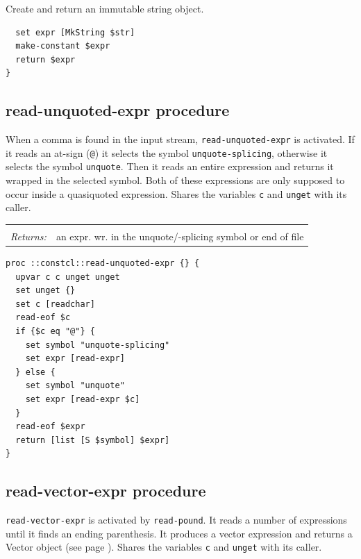 \documentclass[a5paper,draft]{memoir}
\begin{document}
Create and return an immutable string object.

\begin{lstlisting}
  set expr [MkString $str]
  make-constant $expr
  return $expr
}
\end{lstlisting}

\subsection{read-unquoted-expr procedure}
\label{readunquotedexpr-procedure}

When a comma is found in the input stream, \texttt{read-unquoted-expr} is activated. If it reads an at-sign (\texttt{@}) it selects the symbol \texttt{unquote-splicing}, otherwise it selects the symbol \texttt{unquote}. Then it reads an entire expression and returns it wrapped in the selected symbol. Both of these expressions are only supposed to occur inside a quasiquoted expression. Shares the variables \texttt{c} and \texttt{unget} with its caller.

\noindent\begin{tabular}{ |p{1.9cm} p{6.5cm}| }
\hline
\rowcolor[HTML]{CCCCCC} \multicolumn{2}{|l|}{\textbf{read-unquoted-expr (internal)}} \\
\textit{Returns:} & an expr. wr. in the unquote/-splicing symbol or end of file \\
\hline
\end{tabular}

\begin{lstlisting}
proc ::constcl::read-unquoted-expr {} {
  upvar c c unget unget
  set unget {}
  set c [readchar]
  read-eof $c
  if {$c eq "@"} {
    set symbol "unquote-splicing"
    set expr [read-expr]
  } else {
    set symbol "unquote"
    set expr [read-expr $c]
  }
  read-eof $expr
  return [list [S $symbol] $expr]
}
\end{lstlisting}

\subsection{read-vector-expr procedure}
\label{readvectorexpr-procedure}

\texttt{read-vector-expr} is activated by \texttt{read-pound}. It reads a number of expressions until it finds an ending parenthesis. It produces a vector expression and returns a Vector object (see page \pageref{vectors}). Shares the variables \texttt{c} and \texttt{unget} with its caller.
\end{document}
